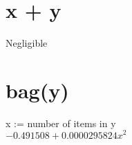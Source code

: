 \documentclass[12pt]{article}
\begin{document}
	\section{x + y}
	Negligible

	\section{bag(y)}
	x := number of items in y\\
	$-0.491508 + 0.0000295824 x^2$
\end{document}
